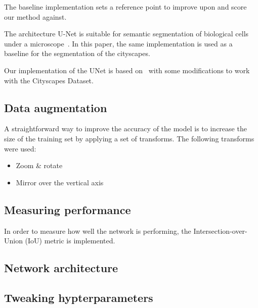 The baseline implementation sets a reference point to improve upon and score our method against.

The architecture U-Net is suitable for semantic segmentation of biological cells under a microscope~\cite{RonnebergerFB15}. 
In this paper, the same implementation is used as a baseline for the segmentation of the cityscapes.

Our implementation of the UNet is based on~\cite{GH-Pytorch-UNet2018} with some modifications to work with the Cityscapes Dataset.

\subsection{Data augmentation}
\label{subsec:data-augmentation}

A straightforward way to improve the accuracy of the model is to increase the size of the training set by applying a set of transforms. The following transforms were used:
\begin{itemize}
    \item Zoom \& rotate
    \item Mirror over the vertical axis
\end{itemize}

\subsection{Measuring performance}
In order to measure how well the network is performing, the Intersection-over-Union (IoU) metric is implemented.

\subsection{Network architecture}
\label{subsec:network-architecture}



\subsection{Tweaking hypterparameters}


